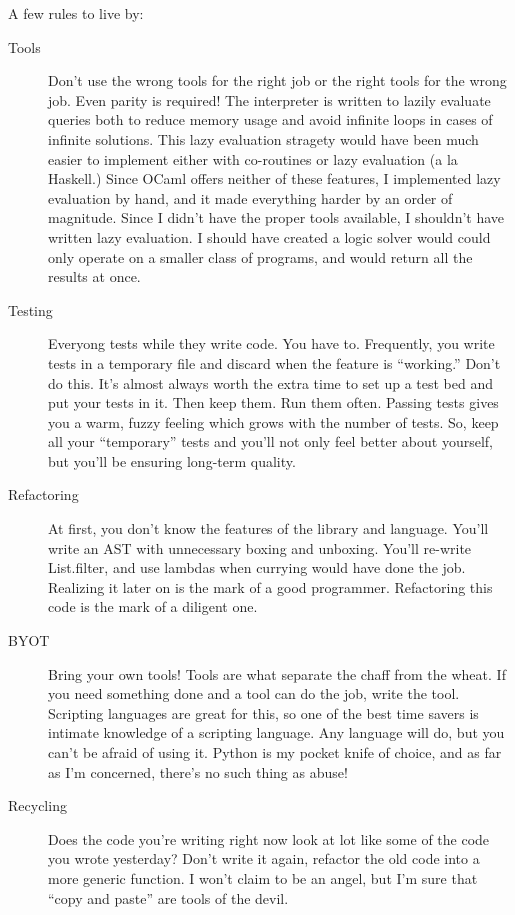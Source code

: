 \documentclass[onecolumn,titlepage]{article}
\begin{document}
A few rules to live by:
\begin{description}
  \item[Tools] Don't use the wrong tools for the right job or the
    right tools for the wrong job.  Even parity is required!  The
    interpreter is written to lazily evaluate queries both to reduce
    memory usage and avoid infinite loops in cases of infinite
    solutions.  This lazy evaluation stragety would have been much
    easier to implement either with co-routines or lazy evaluation (a
    la Haskell.)  Since OCaml offers neither of these features, I
    implemented lazy evaluation by hand, and it made everything harder
    by an order of magnitude.  Since I didn't have the proper tools
    available, I shouldn't have written lazy evaluation.  I should
    have created a logic solver would could only operate on a smaller
    class of programs, and would return all the results at once.

  \item[Testing] Everyong tests while they write code.  You have to.
    Frequently, you write tests in a temporary file and discard when
    the feature is ``working.''  Don't do this.  It's almost always
    worth the extra time to set up a test bed and put your tests in
    it.  Then keep them.  Run them often.  Passing tests gives you a
    warm, fuzzy feeling which grows with the number of tests.  So,
    keep all your ``temporary'' tests and you'll not only feel better
    about yourself, but you'll be ensuring long-term quality.

  \item[Refactoring] At first, you don't know the features of the
    library and language.  You'll write an AST with unnecessary boxing
    and unboxing.  You'll re-write List.filter, and use lambdas when
    currying would have done the job.  Realizing it later on is the
    mark of a good programmer.  Refactoring this code is the mark of a
    diligent one.

  \item[BYOT] Bring your own tools!  Tools are what separate the chaff
    from the wheat.  If you need something done and a tool can do the
    job, write the tool.  Scripting languages are great for this, so
    one of the best time savers is intimate knowledge of a scripting
    language.  Any language will do, but you can't be afraid of using
    it.  Python is my pocket knife of choice, and as far as I'm
    concerned, there's no such thing as abuse!

  \item[Recycling] Does the code you're writing right now look at lot
    like some of the code you wrote yesterday?  Don't write it again,
    refactor the old code into a more generic function.  I won't claim
    to be an angel, but I'm sure that ``copy and paste'' are tools of
    the devil.
\end{description}
\end{document}
